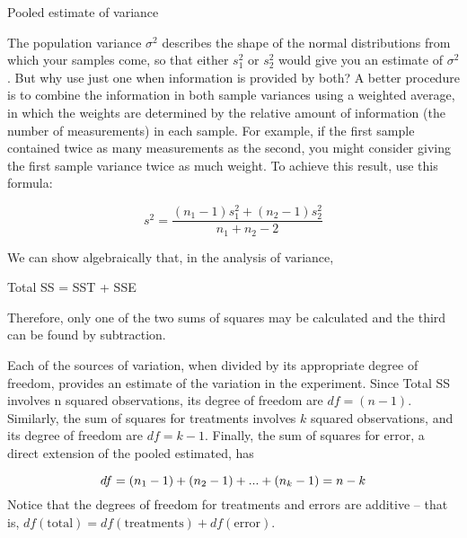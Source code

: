 \documentclass[
  ignorenonframetext,
  aspectratio=169]{beamer}
\begin{document}
\begin{frame}{Pooled estimate of variance}
\protect\hypertarget{pooled-estimate-of-variance}{}
\small

The population variance \(\sigma^2\) describes the shape of the normal
distributions from which your samples come, so that either \(s_1^2\) or
\(s_2^2\) would give you an estimate of \(\sigma^2\) . But why use just
one when information is provided by both? A better procedure is to
combine the information in both sample variances using a weighted
average, in which the weights are determined by the relative amount of
information (the number of measurements) in each sample. For example, if
the first sample contained twice as many measurements as the second, you
might consider giving the first sample variance twice as much weight. To
achieve this result, use this formula:

\[
s^2 = \frac{(n_1 - 1)s_1^2 + (n_2 - 1)s_2^2}{n_1 + n_2 - 2}
\]

We can show algebraically that, in the analysis of variance,

Total SS = SST + SSE

Therefore, only one of the two sums of squares may be calculated and the
third can be found by subtraction.
\end{frame}

\begin{frame}{}
\protect\hypertarget{section-2}{}
\small

Each of the sources of variation, when divided by its appropriate degree
of freedom, provides an estimate of the variation in the experiment.
Since Total SS involves n squared observations, its degree of freedom
are \(df = (n - 1)\). Similarly, the sum of squares for treatments
involves \(k\) squared observations, and its degree of freedom are
\(df = k - 1\). Finally, the sum of squares for error, a direct
extension of the pooled estimated, has

\[
\small
df = (n_1 - 1) + (n_2 - 1) + ... + (n_k - 1) = n - k
\] Notice that the degrees of freedom for treatments and errors are
additive -- that is,
\(df(\text{total}) = df(\text{treatments}) + df (\text{error})\).
\end{frame}
\end{document}
